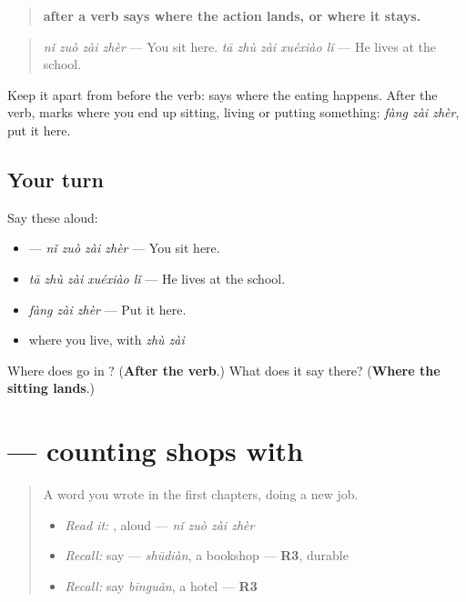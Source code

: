 \begin{grammarlens}[title={Grammar Lens: \zh{在} after the verb, for where the action lands}]
\begin{quote}
\textbf{ after a verb says where the action lands, or where it stays.}
\end{quote}

\begin{quote}
\textbf{} \emph{nǐ zuò zài zhèr} — You sit here. \emph{tā zhù zài xuéxiào lǐ} — He lives at the school.
\end{quote}

Keep it apart from  before the verb:  says where the eating happens. After the verb,  marks where you end up sitting, living or putting something: \emph{fàng zài zhèr}, put it here.
\end{grammarlens}

\subsection*{Your turn}
Say these aloud:

\begin{itemize}
\raggedright
  \item {} — \emph{nǐ zuò zài zhèr} — You sit here.
  \item \emph{tā zhù zài xuéxiào lǐ} — He lives at the school.
  \item \emph{fàng zài zhèr} — Put it here.
  \item where you live, with \emph{zhù zài}
\end{itemize}

\begin{tcolorbox}[breakable,colback=teal!4,colframe=teal!35!black,title={Before you move on}]
Where does  go in ? (\textbf{After the verb}.) What does it say there? (\textbf{Where the sitting lands}.)
\end{tcolorbox}
\section[\texorpdfstring{\zh{一家书店} (yì jiā shūdiàn)}{一家书店 (yì jiā shūdiàn)}]{ — counting shops with }

\label{lesson:ZH-C284-jia-measure}



\begin{quote}
A word you wrote in the first chapters, doing a new job.

\begin{itemize}
\raggedright
  \item \emph{Read it:} , aloud — \emph{nǐ zuò zài zhèr}
  \item \emph{Recall:} say  — \emph{shūdiàn}, a bookshop — \textbf{R3}, durable
  \item \emph{Recall:} say \emph{bīnguǎn}, a hotel — \textbf{R3}
\end{itemize}
\end{quote}

